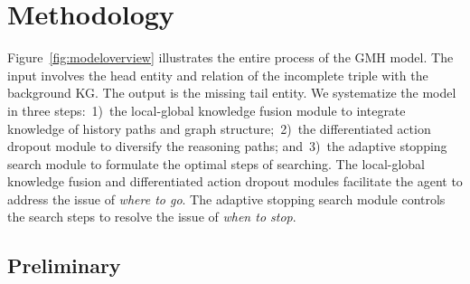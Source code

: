 \section{Methodology}
\label{sec:model}

Figure~\ref{fig:modeloverview} illustrates the entire process of the GMH model. The input involves the head entity and relation of the incomplete triple with the background KG. The output is the missing tail entity.
We systematize the model in three steps:~1)~the local-global knowledge fusion module to integrate knowledge of history paths and graph structure;~2)~the differentiated action dropout module to diversify the reasoning paths; and~3)~the adaptive stopping search module to formulate the optimal steps of searching.
The local-global knowledge fusion and differentiated action dropout modules facilitate the agent to address the issue of \textit{where to go}. The adaptive stopping search module controls the search steps to resolve the issue of \textit{when to stop}.

\subsection{Preliminary}

